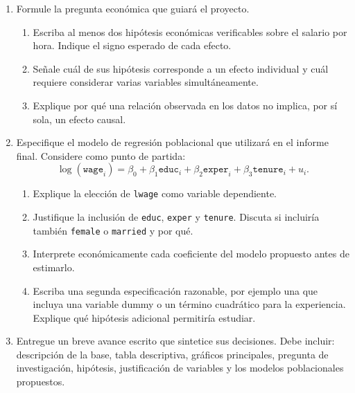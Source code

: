 \documentclass[letterpaper,11pt]{article}
\begin{document}
\begin{enumerate}[resume]

\item Formule la pregunta económica que guiará el proyecto.
    \begin{enumerate}[label=(\alph*)]
        \item Escriba al menos dos hipótesis económicas verificables sobre el
              salario por hora. Indique el signo esperado de cada efecto.
        \item Señale cuál de sus hipótesis corresponde a un efecto individual y
              cuál requiere considerar varias variables simultáneamente.
        \item Explique por qué una relación observada en los datos no implica,
              por sí sola, un efecto causal.
    \end{enumerate}

\item Especifique el modelo de regresión poblacional que utilizará en el
    informe final. Considere como punto de partida:
    \[
        \log(\texttt{wage}_i)
        =\beta_0+\beta_1\texttt{educ}_i
        +\beta_2\texttt{exper}_i
        +\beta_3\texttt{tenure}_i+u_i.
    \]
    \begin{enumerate}[label=(\alph*)]
        \item Explique la elección de \texttt{lwage} como variable dependiente.
        \item Justifique la inclusión de \texttt{educ}, \texttt{exper} y
              \texttt{tenure}. Discuta si incluiría también \texttt{female} o
              \texttt{married} y por qué.
        \item Interprete económicamente cada coeficiente del modelo propuesto
              antes de estimarlo.
        \item Escriba una segunda especificación razonable, por ejemplo una que
              incluya una variable dummy o un término cuadrático para la
              experiencia. Explique qué hipótesis adicional permitiría estudiar.
    \end{enumerate}

\item Entregue un breve avance escrito que sintetice sus decisiones. Debe
    incluir: descripción de la base, tabla descriptiva, gráficos principales,
    pregunta de investigación, hipótesis, justificación de variables y los
    modelos poblacionales propuestos.

\end{enumerate}
\end{document}
